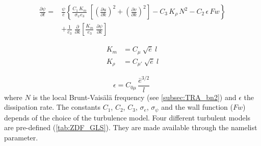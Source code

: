 \documentclass[../main/NEMO_manual]{subfiles}
\begin{document}
\[
  \begin{split}
    \frac{\partial \psi}{\partial t} =& \frac{\psi}{\bar{e}} \left\{
      \frac{C_1\,K_m}{\sigma_{\psi} {e_3}}\;\left[ {\left( \frac{\partial u}{\partial k} \right)^2
          +\left( \frac{\partial v}{\partial k} \right)^2} \right]
      - C_3 \,K_\rho\,N^2   - C_2 \,\epsilon \,Fw   \right\}             \\
    &+\frac{1}{e_3}  \;\frac{\partial }{\partial k}\left[ {\frac{K_m}{e_3 }
        \;\frac{\partial \psi}{\partial k}} \right]\;
  \end{split}
\]

\[
  \begin{split}
    K_m    &= C_{\mu} \ \sqrt {\bar{e}} \ l         \\
    K_\rho &= C_{\mu'}\ \sqrt {\bar{e}} \ l
  \end{split}
\]

\[
  {\epsilon} = C_{0\mu} \,\frac{\bar {e}^{3/2}}{l} \;
\]
where $N$ is the local Brunt-Vais\"{a}l\"{a} frequency (see \autoref{subsec:TRA_bn2}) and
$\epsilon$ the dissipation rate.
The constants $C_1$, $C_2$, $C_3$, ${\sigma_e}$, ${\sigma_{\psi}}$ and the wall function ($Fw$) depends of
the choice of the turbulence model.
Four different turbulent models are pre-defined (\autoref{tab:ZDF_GLS}).
They are made available through the  namelist parameter.
\end{document}
